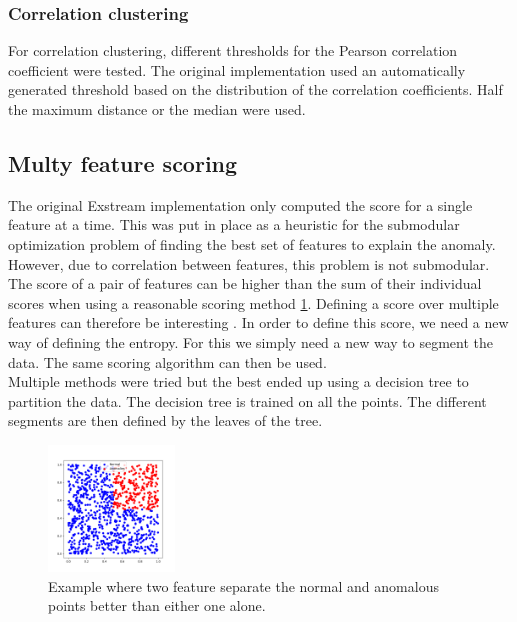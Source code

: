 \documentclass[11pt]{article}
\begin{document}
\subsubsection{Correlation clustering}
For correlation clustering, different thresholds for the Pearson correlation coefficient were tested. The original implementation used an automatically generated threshold based on the distribution of the correlation coefficients. Half the maximum distance or the median were used.


\subsection{Multy feature scoring}
The original Exstream implementation only computed the score for a single feature at a time. This was put in place as a heuristic for the submodular optimization problem of finding the best set of features to explain the anomaly. However, due to correlation between features, this problem is not submodular. The score of a pair of features can be higher than the sum of their individual scores when using a reasonable scoring method \ref{fig:two_feature_example}. Defining a score over multiple features can therefore be interesting \cite{Remi_thesis}. In order to define this score, we need a new way of defining the entropy. For this we simply need a new way to segment the data. The same scoring algorithm can then be used.\\
Multiple methods were tried but the best ended up using a decision tree to partition the data. The decision tree is trained on all the points. The different segments are then defined by the leaves of the tree.


\begin{figure}[h!]
    \centering
    \includegraphics[width=0.3\textwidth]{images/norm_ano_ex.png}  %
    \caption{Example where two feature separate the normal and anomalous points better than either one alone.}
    \label{fig:two_feature_example}
\end{figure}


\end{document}
